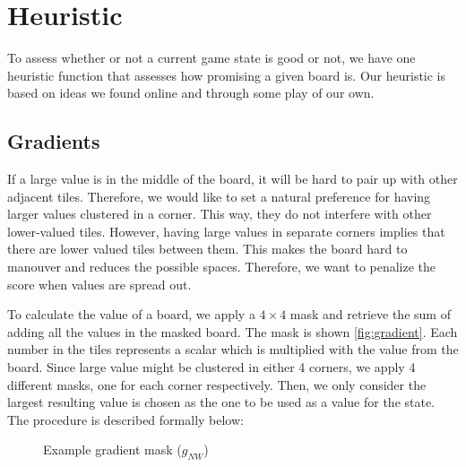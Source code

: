 \documentclass[journal]{IEEEtran}
\begin{document}
\section*{Heuristic}

To assess whether or not a current game state is good or not, we have one
heuristic function that assesses how promising a given board is. 
Our heuristic is based on ideas we found online and through some play of our
own.

\subsection*{Gradients}
If a large value is in the middle of the board, it will be hard to pair up
with other adjacent tiles. Therefore, we would like to set a natural preference
for having larger values clustered in a corner. This way, they do not interfere
with other lower-valued tiles. However, having large values
in separate corners implies that there are lower valued tiles between them.
This makes the board hard to manouver and reduces the possible spaces. 
Therefore, we want to penalize the score when values are spread out.

To calculate the value of a board, we apply a $4\times{}4$ mask and retrieve the
sum of adding all the values in the masked board.
The mask is shown \autoref{fig:gradient}. Each number in the tiles represents a
scalar which is multiplied with the value from the board. Since large value
might be clustered in either 4 corners, we apply 4 different masks, one for
each corner respectively.  Then, we only consider the largest resulting value
is chosen as the one to be used as a value for the state. The procedure is
described formally below:

\begin{figure}[Hb]
\centering
    \caption{Example gradient mask ($g_{NW}$)}
\label{fig:gradient}
\end{figure}
\end{document}
